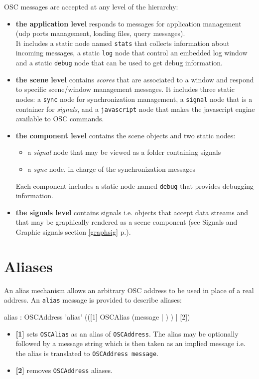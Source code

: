 \documentclass[a4paper,twoside]{report}
\newcommand{\sublevel}[1]	{\section{#1}}
\newcommand{\fullref}[1]	{\ref{#1} p.\pageref{#1}}
\newcommand{\OSC}[1]		{\texttt{#1}}
\begin{document}
OSC messages are accepted at any level of the hierarchy:
\begin{itemize}
\item \textbf{the application level} responds to messages for application management (udp ports management, loading files, query messages). \\
It includes a static node named \OSC{stats} that collects information about incoming messages, a static \OSC{log} node that control an embedded log window and a static \OSC{debug} node that can be used to get debug information.
\item \textbf{the scene level} contains \emph{scores} that are associated to a window and respond to specific scene/window management messages. It includes three static nodes: a \OSC{sync} node for synchronization management, a \OSC{signal} node that is a container for \emph{signals}, and a \OSC{javascript} node that makes the javascript engine available to OSC commands.
\item \textbf{the component level} contains the scene objects and two static nodes:

\begin{itemize}
\item a \emph{signal} node that may be viewed as a folder containing signals
\item a \emph{sync} node, in charge of the synchronization messages
\end{itemize}

Each component includes a static node named \OSC{debug} that provides debugging information.
\item \textbf{the signals level} contains signals i.e. objects that accept data streams and that may be graphically rendered as a scene component (see Signals and Graphic signals section \fullref{graphsig}).

\end{itemize}


\sublevel{Aliases}
\label{alias}
An alias mechanism allows an arbitrary OSC address to be used in place of a real address. An \OSC{alias} message is provided to describe aliases: 
\begin{rail}
alias : OSCAddress 'alias' (([1] OSCAlias (message | ) ) | [2])
\end{rail}
\begin{itemize}
\item \textbf{[1]} sets \OSC{OSCAlias} as an alias of \OSC{OSCAddress}. The alias may be optionally followed by a message string which is then taken as an implied message i.e. the alias is translated to \OSC{OSCAddress message}.
\item \textbf{[2]} removes \OSC{OSCAddress} aliases.
\end{itemize}
\end{document}
